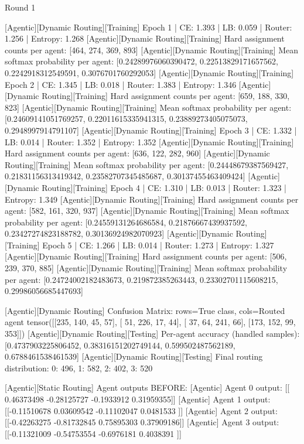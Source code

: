 Round 1

[Agentic][Dynamic Routing][Training] Epoch 1 | CE: 1.393 | LB: 0.059 | Router: 1.256 | Entropy: 1.268
[Agentic][Dynamic Routing][Training] Hard assignment counts per agent: [464, 274, 369, 893]
[Agentic][Dynamic Routing][Training] Mean softmax probability per agent: [0.24289976060390472, 0.22513829171657562, 0.2242918312549591, 0.3076701760292053]
[Agentic][Dynamic Routing][Training] Epoch 2 | CE: 1.345 | LB: 0.018 | Router: 1.383 | Entropy: 1.346
[Agentic][Dynamic Routing][Training] Hard assignment counts per agent: [659, 188, 330, 823]
[Agentic][Dynamic Routing][Training] Mean softmax probability per agent: [0.24609141051769257, 0.22011615335941315, 0.23889273405075073, 0.2948997914791107]
[Agentic][Dynamic Routing][Training] Epoch 3 | CE: 1.332 | LB: 0.014 | Router: 1.352 | Entropy: 1.352
[Agentic][Dynamic Routing][Training] Hard assignment counts per agent: [636, 122, 282, 960]
[Agentic][Dynamic Routing][Training] Mean softmax probability per agent: [0.24448679387569427, 0.21831156313419342, 0.23582707345485687, 0.30137455463409424]
[Agentic][Dynamic Routing][Training] Epoch 4 | CE: 1.310 | LB: 0.013 | Router: 1.323 | Entropy: 1.349
[Agentic][Dynamic Routing][Training] Hard assignment counts per agent: [582, 161, 320, 937]
[Agentic][Dynamic Routing][Training] Mean softmax probability per agent: [0.24559131264686584, 0.21876667439937592, 0.23427274823188782, 0.30136924982070923]
[Agentic][Dynamic Routing][Training] Epoch 5 | CE: 1.266 | LB: 0.014 | Router: 1.273 | Entropy: 1.327
[Agentic][Dynamic Routing][Training] Hard assignment counts per agent: [506, 239, 370, 885]
[Agentic][Dynamic Routing][Training] Mean softmax probability per agent: [0.24724002182483673, 0.219872385263443, 0.23302701115608215, 0.29986056685447693]

[Agentic][Dynamic Routing] Confusion Matrix: rows=True class, cols=Routed agent
tensor([[235, 140,  45,  57],
[ 51, 226,  17,  44],
[ 37,  64, 241,  66],
[173, 152,  99, 353]])
[Agentic][Dynamic Routing][Testing] Per-agent accuracy (handled samples): [0.4737903225806452, 0.38316151202749144, 0.599502487562189, 0.6788461538461539]
[Agentic][Dynamic Routing][Testing] Final routing distribution: {0: 496, 1: 582, 2: 402, 3: 520}

[Agentic][Static Routing] Agent outputs BEFORE:
[Agentic] Agent 0 output: [[ 0.46373498 -0.28125727 -0.1933912   0.31959355]]
[Agentic] Agent 1 output: [[-0.11510678  0.03609542 -0.11102047  0.0481533 ]]
[Agentic] Agent 2 output: [[-0.42263275 -0.81732845  0.75895303  0.37909186]]
[Agentic] Agent 3 output: [[-0.11321009 -0.54753554 -0.6976181   0.4038391 ]]

